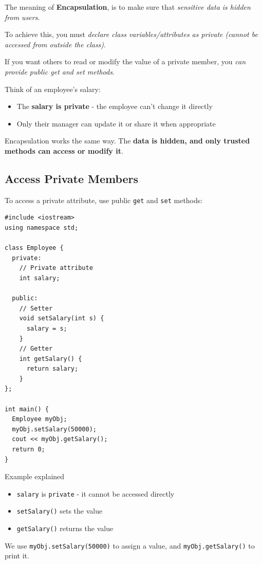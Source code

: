 \documentclass[../basic_programs.tex]{subfiles}
\begin{document}
    \begin{mydef}
        The meaning of \textbf{Encapsulation}, is to make sure that \textit{sensitive data is hidden from users}.
    \end{mydef}

    To achieve this, you must \textit{declare class variables/attributes as private (cannot be accessed from outside the class)}.

    If you want others to read or modify the value of a private member, you \textit{can provide public get and set methods}.

    \begin{exa}
        Think of an employee's salary:
        \begin{itemize}
            \item The \textbf{salary is private} - the employee can't change it directly
            \item Only their manager can update it or share it when appropriate
        \end{itemize}
        Encapsulation works the same way. The \textbf{data is hidden, and only trusted methods can access or modify it}.
    \end{exa}

    \subsection{Access Private Members}

    To access a private attribute, use public \lstinline|get| and \lstinline|set| methods:

    \begin{lstlisting}[caption={caption},label=DescriptiveLabel]
#include <iostream>
using namespace std;

class Employee {
  private:
    // Private attribute
    int salary;

  public:
    // Setter
    void setSalary(int s) {
      salary = s;
    }
    // Getter
    int getSalary() {
      return salary;
    }
};

int main() {
  Employee myObj;
  myObj.setSalary(50000);
  cout << myObj.getSalary();
  return 0;
}
    \end{lstlisting}

    \begin{obs}
        Example explained
        \begin{itemize}
            \item \lstinline|salary| is \lstinline|private| - it cannot be accessed directly
            \item \lstinline|setSalary()| sets the value
            \item \lstinline|getSalary()| returns the value
        \end{itemize}
        We use \lstinline|myObj.setSalary(50000)| to assign a value, and \lstinline|myObj.getSalary()| to print it.
    \end{obs}
\end{document}

